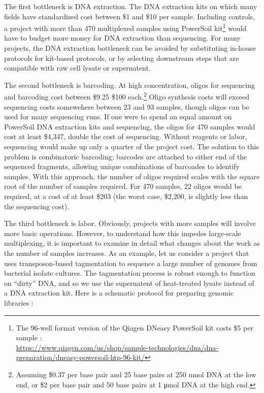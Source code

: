\begin{refsection}
The first bottleneck is DNA extraction. The DNA extraction kits on which many fields have standardized cost between \$1 and \$10 per sample. Including controls, a project with more than 470 multiplexed samples using PowerSoil kit\footnote{The 96-well format version of the Qiagen DNeasy PowerSoil kit costs \$5 per sample :\\ \url{https://www.qiagen.com/us/shop/sample-technologies/dna/dna-preparation/dneasy-powersoil-htp-96-kit/}} would have to budget more money for DNA extraction than sequencing. For many projects, the DNA extraction bottleneck can be avoided by substituting in-house protocols for kit-based protocols, or by selecting downstream steps that are compatible with raw cell lysate or supernatent.

The second bottleneck is barcoding. At high concentration, oligos for sequencing and barcoding cost between \$9.25 \$100 each.\footnote{Assuming \$0.37 per base pair and 25 base pairs at 250 \si{\nano\mole} DNA at the low end, or \$2 per base pair and 50 base pairs at 1 \si{\micro\mole} DNA at the high end.} Oligo synthesis costs will exceed sequencing costs somewehere between 23 and 93 samples, though oligos can be used for many sequencing runs. If one were to spend an equal amount on PowerSoil DNA extraction kits and sequencing, the oligos for 470 samples would cost at least \$4,347, double the cost of sequencing. Without reagents or labor, sequencing would make up only a quarter of the project cost. The solution to this problem is combinatoric barcoding; barcodes are attached to either end of the sequenced fragments, allowing unique combinations of barcoades to identify samples. With this approach, the number of oligos required scales with the square root of the number of samples required. For 470 samples, 22 oligos would be required, at a cost of at least \$203 (the worst case, \$2,200, is slightly less than the sequencing cost).

The third bottleneck is labor. Obviously, projects with more samples will involve more basic operations. However, to understand how this impedes large-scale multiplexing, it is important to examine in detail what changes about the work as the number of samples increases. As an example, let us consider a project that uses transposon-based tagmentation \cite{adey2010rapid} to sequence a large number of genomes from bacterial isolate cultures. The tagmentation process is robust enough to function on ``dirty'' DNA, and so we use the supernatent of heat-treated lysate instead of a DNA extraction kit. Here is a schematic protocol for preparing genomic libraries :


\end{refsection}
